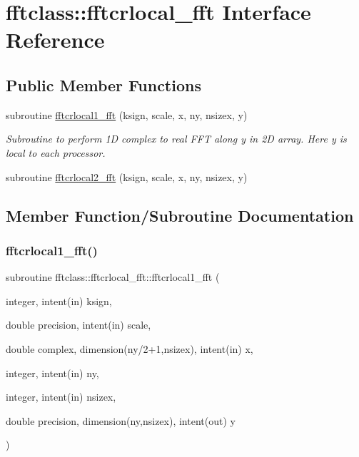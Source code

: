\hypertarget{interfacefftclass_1_1fftcrlocal__fft}{}\section{fftclass\+::fftcrlocal\+\_\+fft Interface Reference}
\label{interfacefftclass_1_1fftcrlocal__fft}
\subsection*{Public Member Functions}
\begin{DoxyCompactItemize}
\item 
subroutine \mbox{\hyperlink{interfacefftclass_1_1fftcrlocal__fft_ae458f5a2de29f771c763c56da7d84c09}{fftcrlocal1\+\_\+fft}} (ksign, scale, x, ny, nsizex, y)
\begin{DoxyCompactList}\small\item\em Subroutine to perform 1D complex to real F\+FT along y in 2D array. Here y is local to each processor. \end{DoxyCompactList}\item 
subroutine \mbox{\hyperlink{interfacefftclass_1_1fftcrlocal__fft_a61c3b16caab87c9a268ae178f67aea26}{fftcrlocal2\+\_\+fft}} (ksign, scale, x, ny, nsizex, y)
\end{DoxyCompactItemize}


\subsection{Member Function/\+Subroutine Documentation}
\mbox{\label{interfacefftclass_1_1fftcrlocal__fft_ae458f5a2de29f771c763c56da7d84c09}} 
\subsubsection{\texorpdfstring{fftcrlocal1\_fft()}{fftcrlocal1\_fft()}}
{\footnotesize\ttfamily subroutine fftclass\+::fftcrlocal\+\_\+fft\+::fftcrlocal1\+\_\+fft (\begin{DoxyParamCaption}\item[{integer, intent(in)}]{ksign,  }\item[{double precision, intent(in)}]{scale,  }\item[{double complex, dimension(ny/2+1,nsizex), intent(in)}]{x,  }\item[{integer, intent(in)}]{ny,  }\item[{integer, intent(in)}]{nsizex,  }\item[{double precision, dimension(ny,nsizex), intent(out)}]{y }\end{DoxyParamCaption})}



